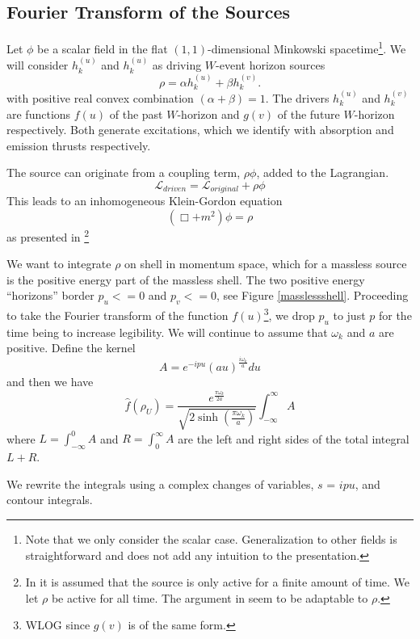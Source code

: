 \documentclass[12pt,a4paper]{article}
\begin{document}
\subsection{Fourier Transform of the Sources}

Let $\phi$ be a scalar field in the flat $(1,1)$-dimensional Minkowski spacetime\footnote{Note that we only consider the scalar case.  Generalization to other fields is straightforward and does not add any intuition to the presentation.}.  We will consider $h^{(u)}_k$ and $h^{(u)}_k$ as driving $W$-event horizon sources
\begin{equation}
\label{ab}
\rho = \alpha h^{(u)}_k + \beta h^{(v)}_k.
\end{equation}
with positive real convex combination $(\alpha + \beta) = 1$.
The drivers $h^{(u)}_k$ and $h^{(v)}_k$ are functions $f(u)$ of the past $W$-horizon and $g(v)$ of the future $W$-horizon respectively.  Both generate excitations, which we identify with absorption and emission thrusts respectively.


The source can originate from a coupling term, $\rho \phi$, added to the Lagrangian.
\[
\mathscr{L}_{driven} = \mathscr{L}_{original} + \rho\phi 
\]
This leads to an inhomogeneous Klein-Gordon equation
\[
(\Box + m^2) \phi = \rho
\]
as presented in \cite{beisert}\footnote{In \cite{beisert} it is assumed that the source is only active for a finite amount of time.  We let $\rho$ be active for all time.  The argument in \cite{beisert} seem to be adaptable to $\rho$.}

We want to integrate $\rho$ on shell in momentum space, which for a massless source is the positive energy part of the massless shell.  The two positive energy ``horizons'' border $p_u <= 0$ and $p_v <= 0$, see Figure \ref{masslessshell}.  Proceeding to take the Fourier transform of the function $f(u)$\footnote{WLOG since $g(v)$ is of the same form.}, we drop $p_u$ to just $p$ for the time being to increase legibility.  We will continue to assume that $\omega_k$ and $a$ are positive. Define the kernel
\[
  A = e^{-i p u} (au)^\frac{i\omega_k}{a} du
\]
and then we have
\begin{equation}
\label{finalnorm}
  \hat{f}(\rho_U) =  \frac{e^{\frac{\pi \omega_k}{2a}}}{\sqrt{2 \sinh \left({\frac{\pi\omega_k}{a}}\right)}}  \int_{-\infty}^\infty A
\end{equation}
where $L=\int_{-\infty}^0 A$ and $R=\int_0^\infty A$ are the left and right sides of the total integral $L + R$.

We rewrite the integrals using a complex changes of variables, $s$ = $ipu$, and contour integrals.
\end{document}
